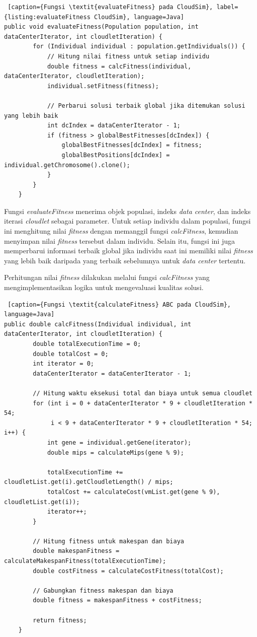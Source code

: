\begin{lstlisting} [caption={Fungsi \textit{evaluateFitness} pada CloudSim}, label={listing:evaluateFitness CloudSim}, language=Java]
public void evaluateFitness(Population population, int dataCenterIterator, int cloudletIteration) {
        for (Individual individual : population.getIndividuals()) {
            // Hitung nilai fitness untuk setiap individu
            double fitness = calcFitness(individual, dataCenterIterator, cloudletIteration);
            individual.setFitness(fitness);

            // Perbarui solusi terbaik global jika ditemukan solusi yang lebih baik
            int dcIndex = dataCenterIterator - 1;
            if (fitness > globalBestFitnesses[dcIndex]) {
                globalBestFitnesses[dcIndex] = fitness;
                globalBestPositions[dcIndex] = individual.getChromosome().clone();
            }
        }
    }
\end{lstlisting}

Fungsi \textit{evaluateFitness} menerima objek populasi, indeks \textit{data center}, dan indeks iterasi \textit{cloudlet} sebagai parameter. Untuk setiap individu dalam populasi, fungsi ini menghitung nilai \textit{fitness} dengan memanggil fungsi \textit{calcFitness}, kemudian menyimpan nilai \textit{fitness} tersebut dalam individu. Selain itu, fungsi ini juga memperbarui informasi terbaik global jika individu saat ini memiliki nilai \textit{fitness} yang lebih baik daripada yang terbaik sebelumnya untuk \textit{data center} tertentu.

Perhitungan nilai \textit{fitness} dilakukan melalui fungsi \textit{calcFitness} yang mengimplementasikan logika untuk mengevaluasi kualitas solusi.

\begin{lstlisting} [caption={Fungsi \textit{calculateFitness} ABC pada CloudSim}, language=Java]
public double calcFitness(Individual individual, int dataCenterIterator, int cloudletIteration) {
        double totalExecutionTime = 0;
        double totalCost = 0;
        int iterator = 0;
        dataCenterIterator = dataCenterIterator - 1;

        // Hitung waktu eksekusi total dan biaya untuk semua cloudlet
        for (int i = 0 + dataCenterIterator * 9 + cloudletIteration * 54;
             i < 9 + dataCenterIterator * 9 + cloudletIteration * 54; i++) {
            int gene = individual.getGene(iterator);
            double mips = calculateMips(gene % 9);

            totalExecutionTime += cloudletList.get(i).getCloudletLength() / mips;
            totalCost += calculateCost(vmList.get(gene % 9), cloudletList.get(i));
            iterator++;
        }

        // Hitung fitness untuk makespan dan biaya
        double makespanFitness = calculateMakespanFitness(totalExecutionTime);
        double costFitness = calculateCostFitness(totalCost);
        
        // Gabungkan fitness makespan dan biaya
        double fitness = makespanFitness + costFitness;

        return fitness;
    }
\end{lstlisting}

